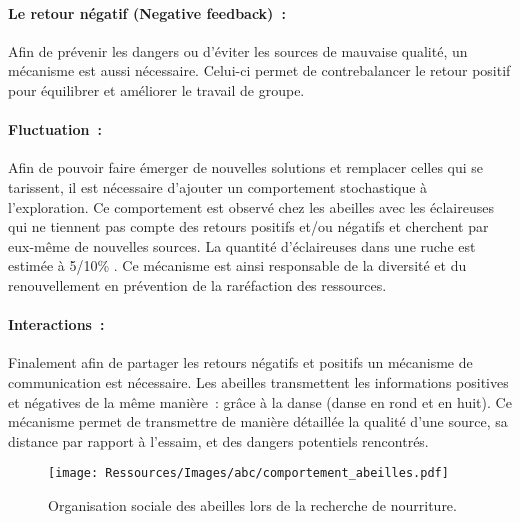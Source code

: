 \paragraph{Le retour négatif (Negative feedback)~:} %
\label{par:negative_feedback}
Afin de prévenir les dangers ou d’éviter les sources de mauvaise qualité, un
mécanisme est aussi nécessaire. Celui-ci permet de contrebalancer le retour
positif pour équilibrer et améliorer le travail de groupe.

\paragraph{Fluctuation~:} %
\label{par:fluctuation}
Afin de pouvoir faire émerger de nouvelles solutions et remplacer celles qui se tarissent,
il est nécessaire d’ajouter un comportement stochastique à l’exploration. Ce comportement
est observé chez les abeilles avec les éclaireuses qui ne tiennent pas compte des retours
positifs et/ou négatifs et cherchent par eux-même de nouvelles sources. La quantité
d’éclaireuses dans une ruche est estimée à 5/10\si{\percent} \parencite{Seeley1996}. Ce
mécanisme est ainsi responsable de la diversité et du renouvellement en prévention de la
raréfaction des ressources.

\paragraph{Interactions~:} %
\label{par:intractions}
Finalement afin de partager les retours négatifs et positifs un mécanisme de
communication est nécessaire.
Les abeilles transmettent les informations positives et négatives de la même
manière~: grâce à la danse (danse en rond et en huit).
Ce mécanisme permet de transmettre de manière détaillée la qualité d’une source, sa
distance par rapport à l’essaim, et des dangers potentiels rencontrés.

\begin{figure}
    \begin{center}
        \texttt{[image: Ressources/Images/abc/comportement\_abeilles.pdf]}
    \end{center}
    \caption{Organisation sociale des abeilles lors de la recherche de nourriture.
             \label{fig:bee_dance}}
\end{figure}


